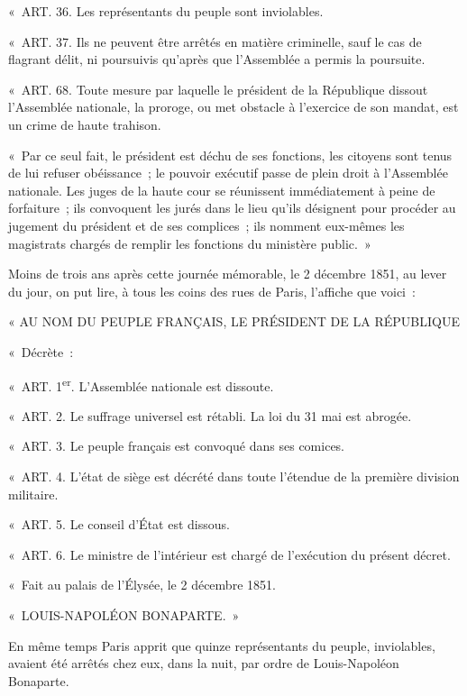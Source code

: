 \documentclass[french,twoside]{book} %
\newenvironment{quoteblock}%
  {\begin{quoting}}
  {\end{quoting}}
\newenvironment{quotebar}{%
    \def\FrameCommand{{\color{rubric!10!}\vrule width 0.5em} \hspace{0.9em}}%
    \def\OuterFrameSep{\itemsep} %
    \MakeFramed {\advance\hsize-\width \FrameRestore}
  }%
  {%
    \endMakeFramed
  }
\renewenvironment{quoteblock}%
  {%
    \savenotes
    \setstretch{0.9}
    \normalfont
    \begin{quotebar}
  }
  {%
    \end{quotebar}
    \spewnotes
  }
\begin{document}
\begin{quoteblock}
 \noindent « ART. 36. Les représentants du peuple sont inviolables.\par
 « ART. 37. Ils ne peuvent être arrêtés en matière criminelle, sauf le cas de flagrant délit, ni poursuivis qu’après que l’Assemblée a permis la poursuite.\par
 « ART. 68. Toute mesure par laquelle le président de la République dissout l’Assemblée nationale, la proroge, ou met obstacle à l’exercice de son mandat, est un crime de haute trahison.\par
 « Par ce seul fait, le président est déchu de ses fonctions, les citoyens sont tenus de lui refuser obéissance ; le pouvoir exécutif passe de plein droit à l’Assemblée nationale. Les juges de la haute cour se réunissent immédiatement à peine de forfaiture ; ils convoquent les jurés dans le lieu qu’ils désignent pour procéder au jugement du président et de ses complices ; ils nomment eux-mêmes les magistrats chargés de remplir les fonctions du ministère public. »
 \end{quoteblock}

\noindent Moins de trois ans après cette journée mémorable, le 2 décembre 1851, au lever du jour, on put lire, à tous les coins des rues de Paris, l’affiche que voici :\par

\begin{quoteblock}
 \noindent « AU NOM DU PEUPLE FRANÇAIS, LE PRÉSIDENT DE LA RÉPUBLIQUE\par
 « Décrète :\par
 « ART. 1\textsuperscript{er}. L’Assemblée nationale est dissoute.\par
 « ART. 2. Le suffrage universel est rétabli. La loi du 31 mai est abrogée.\par
 « ART. 3. Le peuple français est convoqué dans ses comices.\par
 « ART. 4. L’état de siège est décrété dans toute l’étendue de la première division militaire.\par
 « ART. 5. Le conseil d’État est dissous.\par
 « ART. 6. Le ministre de l’intérieur est chargé de l’exécution du présent décret.\par
 « Fait au palais de l’Élysée, le 2 décembre 1851.\par
 « LOUIS-NAPOLÉON BONAPARTE. »
 \end{quoteblock}

\noindent En même temps Paris apprit que quinze représentants du peuple, inviolables, avaient été arrêtés chez eux, dans la nuit, par ordre de Louis-Napoléon Bonaparte.
\end{document}
